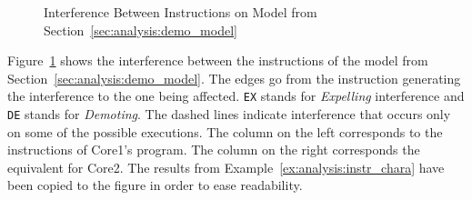 \begin{example}
\begin{figure}[hbt!]
\centering

\caption{Interference Between Instructions on Model from
Section~\ref{sec:analysis:demo_model}}
\label{fig:analysis:interference_between_instructions}
\end{figure}

Figure~\ref{fig:analysis:interference_between_instructions} shows the
interference between the instructions of the model from
Section~\ref{sec:analysis:demo_model}. The edges go from the instruction
generating the interference to the one being affected. \lstinline!EX! stands
for \textit{Expelling} interference and \lstinline!DE! stands for
\textit{Demoting}. The dashed lines indicate interference that
occurs only on some of the possible executions. The column on the left
corresponds to the instructions of Core1's program. The column on the right
corresponds the equivalent for Core2. The results from
Example~\ref{ex:analysis:instr_chara} have been copied to
the figure in order to ease readability.


\end{example}
